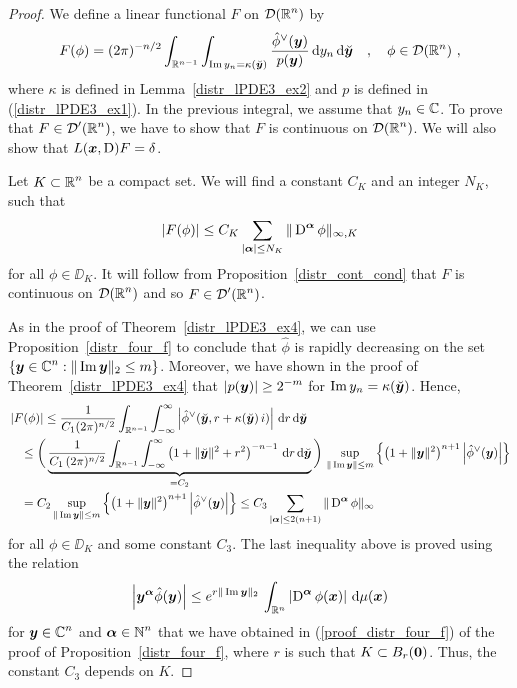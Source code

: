 \begin{proof}
We define a linear functional $F$ on $\displaystyle \mathcal{D}(\mathbb{R}^n)$ by
\[
F(\phi) = (2\pi)^{-n/2} \int_{\mathbb{R}^{n-1}} \int_{\operatorname{Im} y_n = \kappa(\breve{{\bm{y}}})}
\frac{\hat{\phi}^\vee({\bm{y}})}{p({\bm{y}})}\,\mathrm{d}{y_n}\,\mathrm{d}{\breve{{\bm{y}}}}
\quad , \quad \phi \in \mathcal{D}(\mathbb{R}^n) \ ,
\]
where $\kappa$ is defined in Lemma~\ref{distr_lPDE3_ex2} and $p$ is
defined in (\ref{distr_lPDE3_ex1}).  In the previous integral, we
assume that $y_n \in \mathbb{C}$.  To prove that
$\displaystyle F \in \mathcal{D}'(\mathbb{R}^n)$, we have
to show that $F$ is continuous on
$\displaystyle \mathcal{D}(\mathbb{R}^n)$.  We will also show
that $L({\bm{x}},\operatorname{D})F = \delta$.

 Let $\displaystyle K \subset \mathbb{R}^n$ be a compact set.  We will find a
constant $C_K$ and an integer $N_K$, such that
\[
\left|F(\phi)\right| \leq C_K \sum_{|{\bm{\alpha}}|\leq N_K} \|\operatorname{D}^{{\bm{\alpha}}}
\phi\|_{\infty,K}
\]
for all $\phi \in \DD_K$.
It will follow from Proposition~\ref{distr_cont_cond} that $F$ is
continuous on $\displaystyle \mathcal{D}(\mathbb{R}^n)$ and so
$\displaystyle F\in \mathcal{D}'(\mathbb{R}^n)$.

As in the proof of Theorem~\ref{distr_lPDE3_ex4}, we can use
Proposition~\ref{distr_four_f} to conclude that $\hat{\phi}$ is
rapidly decreasing on the set
$\displaystyle \{{\bm{y}} \in \mathbb{C}^n : \|\operatorname{Im} {\bm{y}}\|_2 \leq m \}$.
Moreover, we have shown in the proof of Theorem~\ref{distr_lPDE3_ex4} that
$\displaystyle \left|p({\bm{y}})\right| \geq 2^{-m}$ for
$\operatorname{Im} y_n = \kappa(\breve{{\bm{y}}})$.  Hence, 
\begin{align*}
&\left| F(\phi) \right|
\leq \frac{1}{C_1(2\pi)^{n/2}}
\int_{\mathbb{R}^{n-1}} \int_{-\infty}^\infty
\left| \hat{\phi}^\vee(\breve{{\bm{y}}},r + \kappa(\breve{{\bm{y}}})\,i) \right|
\,\mathrm{d}{r}\,\mathrm{d}{\breve{{\bm{y}}}} \\
&\quad\leq \bigg( \underbrace{ \frac{1}{C_1\,(2\pi)^{n/2}}
\int_{\mathbb{R}^{n-1}} \int_{-\infty}^\infty
\left( 1+\|\breve{{\bm{y}}}\|^2 + r^2\right)^{-n-1} \,\mathrm{d}{r}
  \,\mathrm{d}{\breve{{\bm{y}}}}}_{=C_2} \bigg)
\, \sup_{\|\operatorname{Im} {\bm{y}}\| \leq m } \left\{
\left( 1+ \|{\bm{y}}\|^2  \right)^{n+1}
\left| \hat{\phi}^\vee({\bm{y}}) \right| \right\} \\
&\quad = C_2 \sup_{\|\operatorname{Im} {\bm{y}}\| \leq m} \left\{
\left( 1+\|{\bm{y}}\|^2 \right)^{n+1}
\left| \hat{\phi}^\vee({\bm{y}}) \right| \right\}
\leq C_3 \sum_{|{\bm{\alpha}}|\leq 2(n+1)} \|\operatorname{D}^{{\bm{\alpha}}} \phi\|_\infty
\end{align*}
for all $\phi \in \DD_K$ and some constant $C_3$.
The last inequality above is proved using the relation
\[
\left| {\bm{y}}^{{\bm{\alpha}}} \hat{\phi}({\bm{y}}) \right|
\leq e^{r\|\operatorname{Im} {\bm{y}}\|_2}\,\int_{\mathbb{R}^n}
\left|\operatorname{D}^{{\bm{\alpha}}} \phi({\bm{x}})\right| \,\mathrm{d}{\mu({\bm{x}})}
\]
for $\displaystyle {\bm{y}} \in \mathbb{C}^n$ and
$\displaystyle {\bm{\alpha}} \in \mathbb{N}^n$ that we have obtained in
(\ref{proof_distr_four_f}) of the proof of Proposition~\ref{distr_four_f},
where $r$ is such that $K \subset B_r({\bm{0}})$.
Thus, the constant $C_3$ depends on $K$.


\end{proof}

